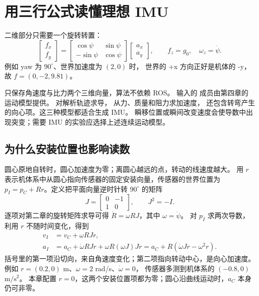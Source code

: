 \section{用三行公式读懂理想 IMU}
二维部分只需要一个旋转转置：
\begin{equation}
\begin{bmatrix}f_x\\f_y\end{bmatrix}
=\begin{bmatrix}\cos\psi&\sin\psi\\-\sin\psi&\cos\psi\end{bmatrix}
\begin{bmatrix}a_x\\a_y\end{bmatrix},
\qquad f_z=g_0,\quad \omega_z=\dot\psi .
\end{equation}
例如 yaw 为 $90^\circ$、世界加速度为 $(2,0)$ 时，
世界的 +x 方向正好是机体的 -y，故 $f=(0,-2,9.81)$。

\par\noindent\begin{minipage}{\linewidth}

\end{minipage}\par

 只保存角速度与比力两个三维向量，算法不依赖 ROS。
输入的  成员由第四章的运动模型提供。
 对解析轨迹求导， 从力、质量和阻力求加速度，
 还包含转弯产生的向心项。这三种模型都适合生成 IMU。
瞬移位置或瞬间改变速度会使导数中出现突变；需要 IMU 的实验应选择上述连续运动模型。

\subsection{为什么安装位置也影响读数}
圆心原地自转时，圆心加速度为零；离圆心越远的点，转动的线速度越大。
用 $r$ 表示机体系中从圆心指向传感器的固定安装向量，传感器的世界位置为
$p_I=p_C+Rr$。定义把平面向量逆时针转 $90^\circ$ 的矩阵
\[
J=\begin{bmatrix}0&-1\\1&0\end{bmatrix},\qquad J^2=-I.
\]
逐项对第二章的旋转矩阵求导可得 $\dot R=\omega RJ$，其中 $\omega=\dot\psi$。
对 $p_I$ 求两次导数，利用 $r$ 不随时间变化，得到
\begin{align}
v_I&=v_C+\omega RJr,\\
a_I&=a_C+\dot\omega RJr+\omega R(\omega J)Jr
    =a_C+R(\dot\omega Jr-\omega^2r).
\end{align}
括号里的第一项沿切向，来自角速度变化；第二项指向转动中心，是向心加速度。
例如 $r=(0.2,0)$ m、$\omega=2$ rad/s、$\dot\omega=0$，
传感器多测到机体系的 $(-0.8,0)$ $\mathrm{m/s^2}$。
本章配置 $r=0$，这两个安装位置项都为零；圆心沿曲线运动时，$a_C$ 本身仍可非零。

